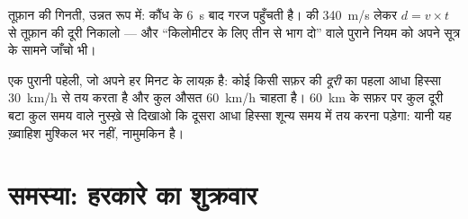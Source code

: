 \begin{exercise}[$\star\star$]\label{exo:g7:motion-average-speed:11}
तूफ़ान की गिनती, उन्नत रूप में: कौंध के \qty{6}{s} बाद गरज पहुँचती
है।  की \qty{340}{m/s} लेकर $d = v \times t$ से तूफ़ान की दूरी
निकालो --- और ``किलोमीटर के लिए तीन से भाग दो'' वाले पुराने नियम को
अपने सूत्र के सामने जाँचो भी।
\end{exercise}

\begin{exercise}[$\star\star\star$]\label{exo:g7:motion-average-speed:12}
एक पुरानी पहेली, जो अपने हर मिनट के लायक़ है: कोई  किसी सफ़र की
\emph{दूरी} का पहला आधा हिस्सा \qty{30}{km/h} से तय करता है और कुल
औसत \qty{60}{km/h} चाहता है। \qty{60}{km} के सफ़र पर कुल दूरी बटा कुल
समय वाले नुस्ख़े से दिखाओ कि दूसरा आधा हिस्सा शून्य समय में तय करना
पड़ेगा: यानी यह ख़्वाहिश मुश्किल भर नहीं, नामुमकिन है।
\end{exercise}

\section{समस्या: हरकारे का शुक्रवार}

